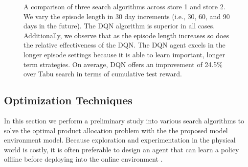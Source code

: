 \begin{figure}[t!]
\centering
{}

\vspace{-4mm}
\caption{A comparison of three search algorithms across store 1 and store 2. We vary the episode length in 30 day increments (i.e., 30, 60, and 90 days in the future). The DQN algorithm is superior in all cases. Additionally, we observe that as the episode length increases so does the relative effectiveness of the DQN. The DQN agent excels in the longer episode settings because it is able to learn important, longer term strategies. On average, DQN offers an improvement of 24.5\% over Tabu search in terms of cumulative test reward.}
\label{optim}
\vspace{-4mm}
\end{figure}


\subsection{Optimization Techniques}



In this section we perform a preliminary study into various search algorithms to solve the optimal product allocation problem with the the proposed model environment model. Because exploration and experimentation in the physical world is costly, it is often preferable to design an agent that can learn a policy offline before deploying into the online environment \cite{kaiser}. 



